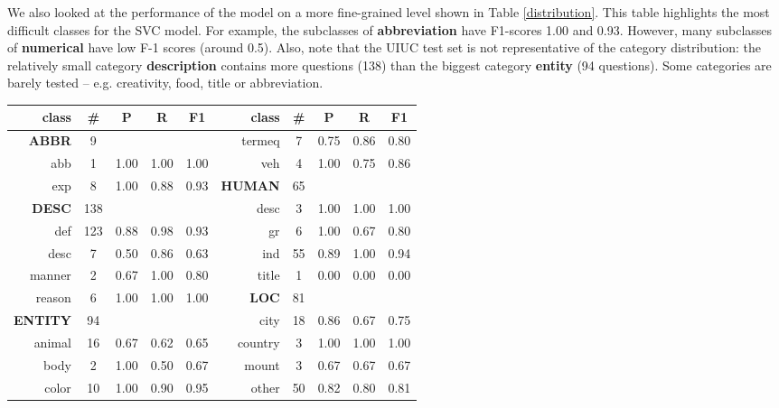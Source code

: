 \documentclass[11pt]{article}
\begin{document}
We also looked at the performance of the model on a more fine-grained level shown in Table \ref{distribution}. This table highlights the most difficult classes for the SVC model. For example, the subclasses of \textbf{abbreviation} have F1-scores 1.00 and 0.93. However, many subclasses of \textbf{numerical} have low F-1 scores (around 0.5).  Also, note that the UIUC test set is not representative of the category distribution: the relatively small category \textbf{description} contains more questions (138) than the biggest category \textbf{entity} (94 questions). Some categories are barely tested -- e.g. creativity, food, title or abbreviation. 
\begin{table}[ht]
\begin{center}
\scriptsize
\begin{tabular}{r | c | c | c | c || r | c | c | c | c}
\hline
class & \# & P & R & F1 & class & \# & P & R & F1 \\
\hline
\textbf{ABBR} & 9 & & &	&  termeq &     7 &  0.75 &      0.86 &      0.80	 \\
   abb &     1 &  1.00 &      1.00 &      1.00  &     veh &     4 &  1.00 &      0.75 &      0.86	 \\
   exp &     8 &  1.00 &      0.88 &      0.93  &  \textbf{HUMAN} & 65 & & &													 \\
\textbf{DESC} & 138& & &								  &     desc &     3 &  1.00 &      1.00 &      1.00	 \\
   def &   123 &  0.88 &      0.98 &      0.93  &       gr &     6 &  1.00 &      0.67 &      0.80	 \\
  desc &     7 &  0.50 &      0.86 &      0.63  &      ind &    55 &  0.89 &      1.00 &      0.94	 \\
manner &     2 &  0.67 &      1.00 &      0.80  &    title &     1 &  0.00 &      0.00 &      0.00		 \\
reason &     6 &  1.00 &      1.00 &      1.00  &  \textbf{LOC} & 81 & & &													 \\
\textbf{ENTITY} & 94 & & & &     city &    18 &  0.86 &      0.67 &      0.75	 \\
animal &    16 &  0.67 &      0.62 &      0.65  &  country &     3 &  1.00 &      1.00 &      1.00	 \\
  body &     2 &  1.00 &      0.50 &      0.67  &    mount &     3 &  0.67 &      0.67 &      0.67	 \\
 color &    10 &  1.00 &      0.90 &      0.95  &    other &    50 &  0.82 &      0.80 &      0.81		 \\

\end{tabular}
\end{center}
\end{table}
\end{document}
